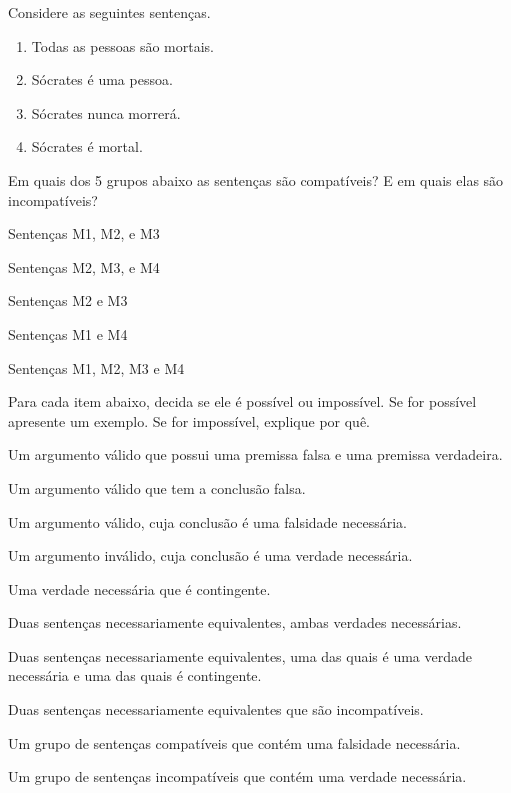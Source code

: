 \problempart Considere as seguintes sentenças.
\begin{enumerate}%
\item[M1.] \label{itm:allmortal} Todas as pessoas são mortais.
\item[M2.] \label{itm:socperson} Sócrates é uma pessoa.
\item[M3.] \label{itm:socnotdie} Sócrates nunca morrerá.
\item[M4.] \label{itm:socmortal} Sócrates é mortal.
\end{enumerate}
Em quais dos 5 grupos abaixo as sentenças são compatíveis? E em quais elas são incompatíveis?
\begin{earg}
\item Sentenças M1, M2, e M3
\item Sentenças M2, M3, e M4
\item Sentenças M2 e M3
\item Sentenças M1 e M4
\item Sentenças M1, M2, M3 e M4
\end{earg}

\problempart
\label{pr.EnglishCombinations2}
Para cada item abaixo, decida se ele é possível ou impossível.
Se for possível apresente um exemplo.
Se for impossível, explique por quê.
\begin{earg}
\item Um argumento válido que possui uma premissa falsa e uma premissa verdadeira.

\item Um argumento válido que tem a conclusão falsa.

\item Um argumento válido, cuja conclusão é uma falsidade necessária.

\item Um argumento inválido, cuja conclusão é uma verdade necessária.

\item Uma verdade necessária que é contingente.

\item Duas sentenças necessariamente equivalentes, ambas verdades necessárias.

\item Duas sentenças necessariamente equivalentes, uma das quais é uma verdade necessária e uma das quais é contingente.

\item Duas sentenças necessariamente equivalentes que são incompatíveis.

\item Um grupo de sentenças compatíveis que contém uma falsidade necessária.

\item Um grupo de sentenças incompatíveis que contém uma verdade necessária.
\end{earg}



